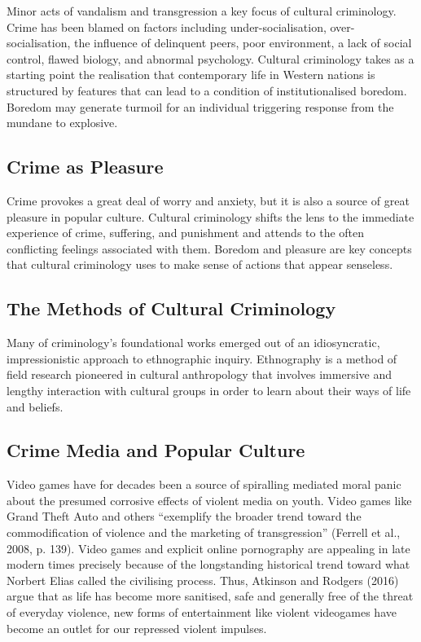 \documentclass{article}
\begin{document}
Minor acts of vandalism and transgression a key focus of cultural criminology. Crime has been blamed on factors including under-socialisation, over-socialisation, the influence of delinquent peers, poor environment, a lack of social control, flawed biology, and abnormal psychology. Cultural criminology takes as a starting point the realisation that contemporary life in Western nations is structured by features that can lead to a condition of institutionalised boredom. Boredom may generate turmoil for an individual triggering response from the mundane to explosive.

\subsection{Crime as Pleasure}

Crime provokes a great deal of worry and anxiety, but it is also a source of great pleasure in popular culture. Cultural criminology shifts the lens to the immediate experience of crime, suffering, and punishment and attends to the often conflicting feelings associated with them. Boredom and pleasure are key concepts that cultural criminology uses to make sense of actions that appear senseless.

\subsection{The Methods of Cultural Criminology}

Many of criminology’s foundational works emerged out of an idiosyncratic, impressionistic approach to ethnographic inquiry. Ethnography is a method of field research pioneered in cultural anthropology that involves immersive and lengthy interaction with cultural groups in order to learn about their ways of life and beliefs.

\subsection{Crime Media and Popular Culture}

Video games have for decades been a source of spiralling mediated moral panic about the presumed corrosive effects of violent media on youth. Video games like Grand Theft Auto and others “exemplify the broader trend toward the commodification of violence and the marketing of transgression” (Ferrell et al., 2008, p. 139). Video games and explicit online pornography are appealing in late modern times precisely because of the longstanding historical trend toward what Norbert Elias called the civilising process. Thus, Atkinson and Rodgers (2016) argue that as life has become more sanitised, safe and generally free of the threat of everyday violence, new forms of entertainment like violent videogames have become an outlet for our repressed violent impulses.
\end{document}
